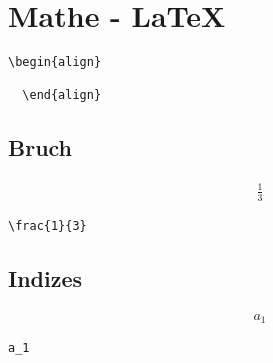 


\section{Mathe - LaTeX}\label{matheLatex}

\lstset{language=[LaTeX]TeX } %
\begin{lstlisting}[gobble=2, frame=none, numbers=none, backgroundcolor=\color{white},%
	caption={},label={code:}]
  \begin{align}

  \end{align}
\end{lstlisting}

\subsection{Bruch}\label{bruch}

\begin{align}
	\frac{1}{3}
\end{align}

\lstset{language=[LaTeX]TeX } %
\begin{lstlisting}[gobble=2, frame=none, numbers=none, backgroundcolor=\color{white},%
	caption={},label={code:}]
  \frac{1}{3}
\end{lstlisting}


\subsection{Indizes}\label{indizes}

\begin{align}
  a_1
\end{align}

\lstset{language=[LaTeX]TeX } %
\begin{lstlisting}[gobble=2, frame=none, numbers=none, backgroundcolor=\color{white},%
	caption={},label={code:}]
  a_1
\end{lstlisting}

